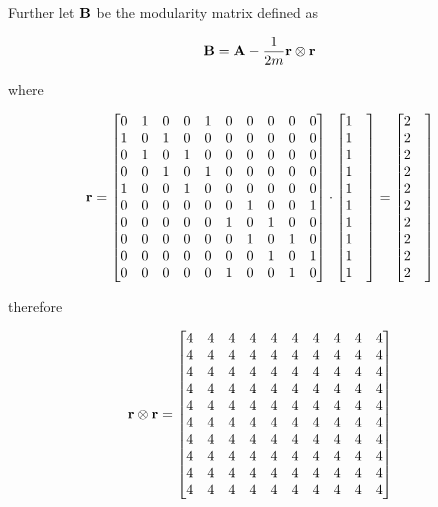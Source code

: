 \documentclass[a4paper,12pt]{article}
\begin{document}
	Further let $\bf B$ be the modularity matrix defined as 
	
	\[ {\bf B} = {\bf A} - \frac{1}{2m}{\bf r}\otimes {\bf r} \]
	
	where 
	
	\[ {\bf r} = \begin{bmatrix}
		0& 1& 0& 0& 1& 0& 0& 0& 0& 0\\
		1& 0& 1& 0& 0& 0& 0& 0& 0& 0\\
		0& 1& 0& 1& 0& 0& 0& 0& 0& 0\\
		0& 0& 1& 0& 1& 0& 0& 0& 0& 0\\
		1& 0& 0& 1& 0& 0& 0& 0& 0& 0\\
		0& 0& 0& 0& 0& 0& 1& 0& 0& 1\\
		0& 0& 0& 0& 0& 1& 0& 1& 0& 0\\
		0& 0& 0& 0& 0& 0& 1& 0& 1& 0\\
		0& 0& 0& 0& 0& 0& 0& 1& 0& 1\\
		0& 0& 0& 0& 0& 1& 0& 0& 1& 0
	\end{bmatrix} \cdot \begin{bmatrix}
	1 & \\ 1 & \\ 1 & \\ 1 & \\ 1 & \\ 1 & \\ 1 & \\ 1 & \\ 1 & \\ 1 & \\
	\end{bmatrix} = \begin{bmatrix}
	2 & \\ 2 & \\ 2 & \\ 2 & \\ 2 & \\ 2 & \\ 2 & \\ 2 & \\ 2 & \\ 2 & \\
	\end{bmatrix} \]
	
	therefore
	
	\[ {\bf r}\otimes {\bf r} = \begin{bmatrix}
		4& 4& 4& 4& 4& 4& 4& 4& 4& 4\\
		4& 4& 4& 4& 4& 4& 4& 4& 4& 4\\
		4& 4& 4& 4& 4& 4& 4& 4& 4& 4\\
		4& 4& 4& 4& 4& 4& 4& 4& 4& 4\\
		4& 4& 4& 4& 4& 4& 4& 4& 4& 4\\
		4& 4& 4& 4& 4& 4& 4& 4& 4& 4\\
		4& 4& 4& 4& 4& 4& 4& 4& 4& 4\\
		4& 4& 4& 4& 4& 4& 4& 4& 4& 4\\
		4& 4& 4& 4& 4& 4& 4& 4& 4& 4\\
		4& 4& 4& 4& 4& 4& 4& 4& 4& 4
	\end{bmatrix}\]
	
\end{document}
